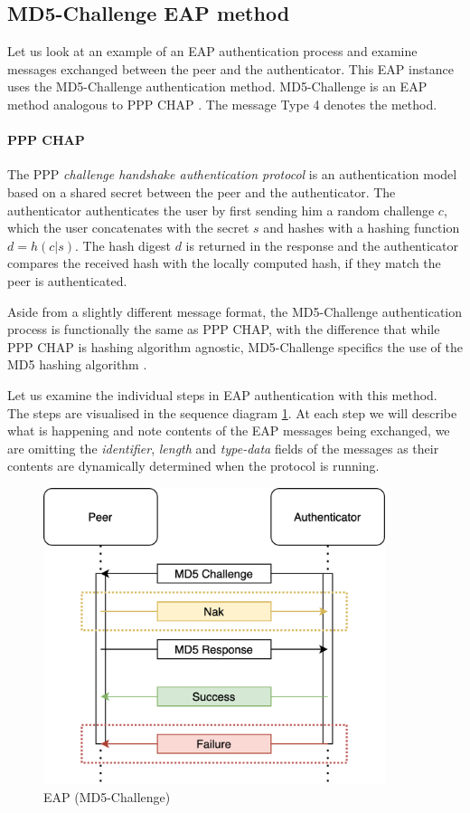 \subsection{MD5-Challenge EAP method}
Let us look at an example of an EAP authentication process and examine messages exchanged between the peer and the authenticator. This EAP instance uses the MD5-Challenge authentication method.
MD5-Challenge is an EAP method analogous to PPP CHAP \cite{simpson1996ppp}. The message Type 4 denotes the method.

\paragraph{PPP CHAP}
The PPP \textit{challenge handshake authentication protocol} is an authentication model based on a shared secret between the peer and the authenticator.
The authenticator authenticates the user by first sending him a random challenge $c$, which the user concatenates with the secret $s$ and hashes with a hashing function $d = h(c | s)$.
The hash digest $d$ is returned in the response and the authenticator compares the received hash with the locally computed hash, if they match the peer is authenticated.

Aside from a slightly different message format, the MD5-Challenge authentication process is functionally the same as PPP CHAP, with the difference that while PPP CHAP is hashing algorithm agnostic, MD5-Challenge specifics the use of the MD5 hashing algorithm \cite{rivest1992md5}.

\bigskip
\noindent
Let us examine the individual steps in EAP authentication with this method. 
The steps are visualised in the sequence diagram \ref{fig:eap-md5}.
At each step we will describe what is happening and note contents of the EAP messages being exchanged, we are omitting the \textit{identifier}, \textit{length} and \textit{type-data} fields of the messages as their contents are dynamically determined when the protocol is running.

\begin{figure}[h]
	\centering
	\includegraphics[width=10cm]{images/eap-md5-2}
	\caption{EAP (MD5-Challenge)}
	\label{fig:eap-md5}
\end{figure}

